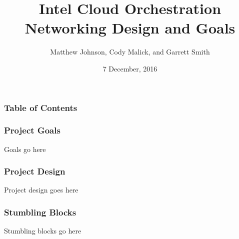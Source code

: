 \documentclass{beamer}
\begin{document}
\title{Intel Cloud Orchestration Networking Design and Goals}
\author{Matthew Johnson, Cody Malick, and Garrett Smith}
\date{7 December, 2016}

\maketitle

\begin{frame}
  \frametitle{Table of Contents}
  \tableofcontents
\end{frame}

\begin{frame}
  \frametitle{Project Goals}
  Goals go here
\end{frame}

\begin{frame}
  \frametitle{Project Design}
  Project design goes here
\end{frame}

\begin{frame}
  \frametitle{Stumbling Blocks}
  Stumbling blocks go here
\end{frame}
\end{document}
